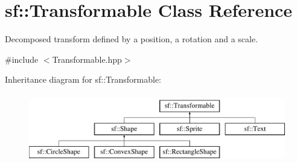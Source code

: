 \hypertarget{classsf_1_1_transformable}{}\section{sf\+:\+:Transformable Class Reference}
\label{classsf_1_1_transformable}


Decomposed transform defined by a position, a rotation and a scale.  




{\ttfamily \#include $<$Transformable.\+hpp$>$}

Inheritance diagram for sf\+:\+:Transformable\+:\begin{figure}[H]
\begin{center}
\leavevmode
\includegraphics[height=3.000000cm]{classsf_1_1_transformable}
\end{center}
\end{figure}
